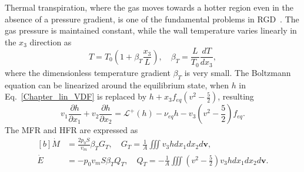 Thermal transpiration, where the gas moves towards a hotter region even in the absence of a pressure gradient, is one of the fundamental problems in RGD~\citep{Reynolds1879,Maxwell1879vii}. The gas pressure is maintained constant, while the wall temperature varies linearly in the $x_3$ direction as
\begin{equation}
T=T_0\left(1+\beta_T\frac{x_3}{L}\right), \quad
\beta_T=\frac{L}{T_0}\frac{dT}{dx_3},
\end{equation} 
where the dimensionless temperature gradient $\beta_T$ is very small. The Boltzmann equation can be linearized around the equilibrium state, when $h$ in Eq.~\eqref{Chapter_lin_VDF} is replaced by $h+x_3f_{eq}({v}^2-\frac{5}{2})$, resulting 
\begin{equation}\label{thermal_tube}
v_1\frac{\partial h}{\partial x_1}+v_2\frac{\partial h}{\partial x_2}=\mathcal{L}^+(h)-\nu_{eq}{h}-{v_3}\left({v}^2-\frac{5}{2}\right)f_{eq}.
\end{equation}
The MFR and HFR are expressed as
\begin{equation}\label{normalized_MFR_thermal}  
\begin{aligned}[b]
\dot{M}&=\frac{2p_0S}{v_m}\beta_TG_T, \quad  G_T=\frac{1}{A}\iiint {v_3h}dx_1dx_2d\bm{v}, \\
\dot{E}&=-p_0v_mS\beta_T{}Q_T, \quad   Q_T=-\frac{1}{A}\iiint {\left({v}^2-\frac{5}{2}\right)v_3}hdx_1dx_2d\bm{v}.
\end{aligned}
\end{equation}





